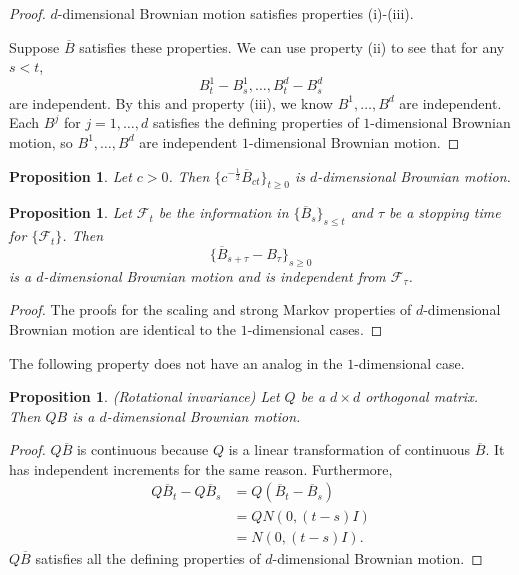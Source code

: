 \documentclass{tufte-handout}
\newtheorem{prop}[thm]{Proposition}
\theoremstyle{definition}
\begin{document}
\begin{proof}
	 $d$-dimensional Brownian motion satisfies properties (i)-(iii).

	 Suppose $\overline{B}$ satisfies these properties. We can use property (ii) to see that for any $s < t$, \[
		B_t^1 - B_s^1, \ldots ,B_t^d - B_s^d
	\] are independent.
	By this and property (iii), we know $B^1,\ldots, B^d$ are independent. Each $B^j$ for $j=1,\ldots,d$ satisfies the defining properties of $1$-dimensional Brownian motion, so $B^1,\ldots,B^d$ are independent $1$-dimensional Brownian motion.
\end{proof}

\begin{prop}
	Let $c>0$. Then $\{c^{-\frac{1}{2}} \overline{B}_{ct}\}_{t\ge 0}$ is $d$-dimensional Brownian motion.
\end{prop}

\begin{prop}
	Let $\mathscr{F}_t$ be the information in $\{\overline{B}_s\}_{s\le t}$ and $\tau$ be a stopping time for $\{\mathscr{F}_t\}$. Then \[
		\{\overline{B}_{s + \tau} - B_\tau\}_{s\ge 0}
	\] is a $d$-dimensional Brownian motion and is independent from $\mathscr{F_\tau}$.
\end{prop}

\begin{proof}
	The proofs for the scaling and strong Markov properties of $d$-dimensional Brownian motion are identical to the $1$-dimensional cases.
\end{proof}

The following property does not have an analog in the $1$-dimensional case.

\begin{prop}
	(Rotational invariance) Let $Q$ be a $d\times d$ orthogonal matrix. Then $QB$ is a $d$-dimensional Brownian motion.
\end{prop}
\begin{proof}
	$Q\overline{B}$ is continuous because $Q$ is a linear transformation of continuous $\overline{B}$. It has independent increments for the same reason.
	Furthermore,
	\begin{align*}
		Q \overline{B}_t - Q \overline{B}_s &= Q\left( \overline{B}_t - \overline{B}_s \right) \\
											&= Q N\left( 0, (t-s)I \right) \\
											&= N\left(0, (t-s)I\right)
	.\end{align*}
	$Q\overline{B}$ satisfies all the defining properties of $d$-dimensional Brownian motion.
\end{proof}
\end{document}

